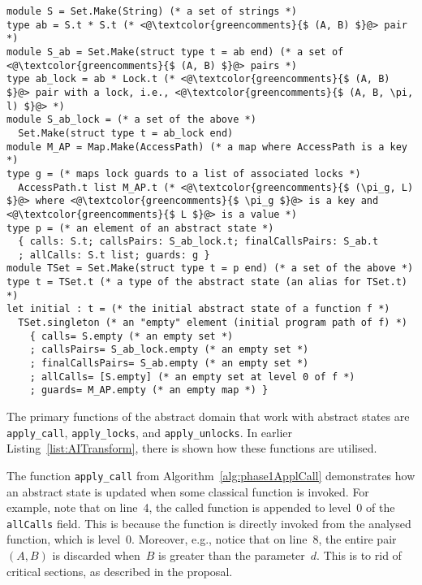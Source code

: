 \begin{lstlisting}[style=ocaml, label={list:phase1AbsState}, float=hbt, caption={A~definition of the \emph{abstract state} in Phase~1}]
module S = Set.Make(String) (* a set of strings *)
type ab = S.t * S.t (* <@\textcolor{greencomments}{$ (A, B) $}@> pair *)
module S_ab = Set.Make(struct type t = ab end) (* a set of <@\textcolor{greencomments}{$ (A, B) $}@> pairs *)
type ab_lock = ab * Lock.t (* <@\textcolor{greencomments}{$ (A, B) $}@> pair with a lock, i.e., <@\textcolor{greencomments}{$ (A, B, \pi, l) $}@> *)
module S_ab_lock = (* a set of the above *)
  Set.Make(struct type t = ab_lock end)
module M_AP = Map.Make(AccessPath) (* a map where AccessPath is a key *)
type g = (* maps lock guards to a list of associated locks *)
  AccessPath.t list M_AP.t (* <@\textcolor{greencomments}{$ (\pi_g, L) $}@> where <@\textcolor{greencomments}{$ \pi_g $}@> is a key and <@\textcolor{greencomments}{$ L $}@> is a value *)
type p = (* an element of an abstract state *)
  { calls: S.t; callsPairs: S_ab_lock.t; finalCallsPairs: S_ab.t
  ; allCalls: S.t list; guards: g }
module TSet = Set.Make(struct type t = p end) (* a set of the above *)
type t = TSet.t (* a type of the abstract state (an alias for TSet.t) *)
let initial : t = (* the initial abstract state of a function f *)
  TSet.singleton (* an "empty" element (initial program path of f) *)
    { calls= S.empty (* an empty set *)
    ; callsPairs= S_ab_lock.empty (* an empty set *)
    ; finalCallsPairs= S_ab.empty (* an empty set *)
    ; allCalls= [S.empty] (* an empty set at level 0 of f *)
    ; guards= M_AP.empty (* an empty map *) }
\end{lstlisting}

The primary functions of the abstract domain that work with abstract states are \texttt{apply\_call}, \texttt{apply\_locks}, and \texttt{apply\_unlocks}. In earlier Listing~\ref{list:AITransform}, there is shown how these functions are utilised.

The function \texttt{apply\_call} from Algorithm~\ref{alg:phase1ApplCall} demonstrates how an abstract state is updated when some classical function is invoked. For example, note that on line~4, the called function is appended to level~0 of the \texttt{allCalls} field. This is because the function is directly invoked from the analysed function, which is level~0. Moreover, e.g., notice that on line~8, the entire pair $ (A, B) $ is discarded when~$ B $ is greater than the parameter~$ d $. This is to rid of  critical sections, as described in the proposal.

